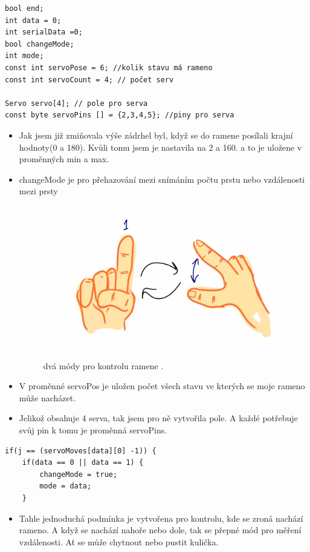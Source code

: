 \documentclass[12pt, a4paper,
twoside,        %
openright
]{report}
\begin{document}
{\begin{lstlisting}[style=Python, caption={Inicializace potřebných hodnot}]
bool end;
int data = 0;
int serialData =0;
bool changeMode;
int mode;
const int servoPose = 6; //kolik stavu má rameno
const int servoCount = 4; // počet serv

Servo servo[4]; // pole pro serva 
const byte servoPins [] = {2,3,4,5}; //piny pro serva
\end{lstlisting}


\begin{itemize}
	\item Jak jsem již zmiňovala výše zádrhel byl, když se do ramene posílali krajní hodnoty(0 a 180). Kvůli tomu jsem je nastavila na 2 a 160. a to je uložene v proměnných min a max.
	\item changeMode je pro přehazování mezi snímáním počtu prstu nebo vzdálenosti mezi prsty
	
\begin{figure}[h]
	
	\centering
	\includegraphics[width=0.3\linewidth]{image/mody.jpg} 
	
	
	\caption{dvá módy pro kontrolu ramene \cite{módy ramene}.} %
	\label{fig:uhlyVGestech} %
\end{figure}
\item   V proměnné servoPos je uložen počet všech stavu ve kterých se moje rameno může nacházet.
\item Jelikož obsahuje 4 serva, tak jsem pro ně vytvořila pole. A každé potřebuje svůj pin k tomu je proměnná servoPins.
	
\end{itemize}



\begin{lstlisting}[style=Python, caption={podmínka pro přepínání módu}]
if(j == (servoMoves[data][0] -1)) {
	if(data == 0 || data == 1) {
		changeMode = true;
		mode = data;
	}
\end{lstlisting}

\begin{itemize}
		\item Tahle jednoduchá podmínka je vytvořena pro kontrolu, kde se zroná nachází rameno. A když se nachází nahoře nebo dole, tak se přepné mód pro měření vzdálenosti. Ať se může chytnout nebo pustit kulička.


\end{itemize}}
\end{document}
